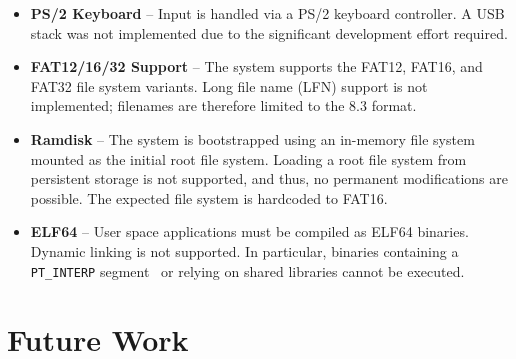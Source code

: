 \documentclass[a4paper,10pt,twoside]{report}
\theoremstyle{definition}
\begin{document}
\begin{itemize}
    \item \textbf{PS/2 Keyboard} -- Input is handled via a PS/2 keyboard controller. A USB stack was not implemented due to the significant development effort required. 
    \item \textbf{FAT12/16/32 Support} -- The system supports the FAT12, FAT16, and FAT32 file system variants. Long file name (LFN) support is not implemented; filenames are therefore limited to the 8.3 format.
    \item \textbf{Ramdisk} -- The system is bootstrapped using an in-memory file system mounted as the initial root file system. Loading a root file system from persistent storage is not supported, and thus, no permanent modifications are possible. The expected file system is hardcoded to FAT16.
    \item \textbf{ELF64} -- User space applications must be compiled as ELF64 binaries. Dynamic linking is not supported. In particular, binaries containing a \texttt{PT\_INTERP} segment~\cite{elf-spec-dynamic} or relying on shared libraries cannot be executed.
\end{itemize}

\section{Future Work}
\end{document}
